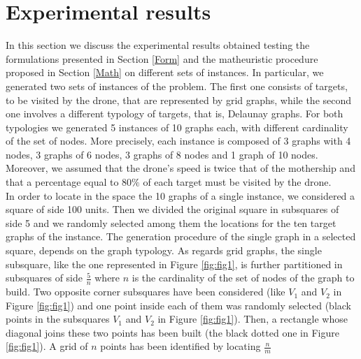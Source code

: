 \section{Experimental results}


\noindent
In this section we discuss the experimental results obtained testing the formulations presented in Section \ref{Form} and the matheuristic procedure proposed in Section \ref{Math} on different sets of instances. In particular, we generated two sets of instances of the \AMD\xspace problem. The first one consists of targets, to be visited by the drone, that are represented by grid graphs, while the second one involves a different typology of targets, that is, Delaunay graphs. 
For both typologies we generated 5 instances of 10 graphs each, with different cardinality of the set of nodes. More precisely, each instance is composed of 3 graphs with 4 nodes, 3 graphs of 6 nodes, 3 graphs of 8 nodes and 1 graph of 10 nodes. Moreover, we assumed that the drone's speed is twice that of the mothership and that a percentage equal to $80\%$ of each target must be visited by the drone.\\
In order to locate in the space the 10 graphs of a single instance, we considered a square of side 100 units. Then we divided the original square in subsquares of side 5 and we randomly selected among them the locations for the ten target graphs of the instance. The generation procedure of the single graph in a selected square, depends on the graph typology.
As regards grid graphs, the single subsquare, like the one represented in Figure \ref{fig:fig1}, is further partitioned in subsquares of side $\frac{5}{n}$ where $n$ is the cardinality of the set of nodes of the graph to build. Two opposite corner subsquares have been considered (like $V_1$ and $V_2$ in Figure \ref{fig:fig1}) and one point inside each of them was randomly selected (black points in the subsquares $V_1$ and $V_2$ in Figure \ref{fig:fig1}). Then, a rectangle whose diagonal joins these two points has been built (the black dotted one in Figure \ref{fig:fig1}). A grid of $n$ points has been identified by locating $\frac{n}{m}$ 
